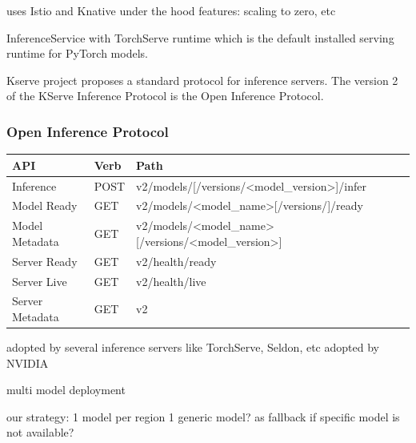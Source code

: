 uses Istio and Knative under the hood
features: scaling to zero, etc


InferenceService with TorchServe runtime which is the default installed serving runtime for PyTorch models.

Kserve project proposes a standard protocol for inference servers.
The version 2 of the KServe Inference Protocol is the Open Inference Protocol.

\subsubsection{Open Inference Protocol}

\begin{table}[h!]
\centering
\begin{tabular}{|l|l|l|}
\hline
\textbf{API}    & \textbf{Verb} & \textbf{Path}                                                                                         \\ \hline
Inference       & POST          & v2/models/{[}/versions/\textless{}model\_version\textgreater{}{]}/infer                               \\ \hline
Model Ready     & GET           & v2/models/\textless{}model\_name\textgreater{}{[}/versions/{]}/ready                                  \\ \hline
Model Metadata  & GET           & v2/models/\textless{}model\_name\textgreater{}{[}/versions/\textless{}model\_version\textgreater{}{]} \\ \hline
Server Ready    & GET           & v2/health/ready                                                                                       \\ \hline
Server Live     & GET           & v2/health/live                                                                                        \\ \hline
Server Metadata & GET           & v2                                                                                                    \\ \hline
\end{tabular}
\end{table}




adopted by several inference servers like TorchServe, Seldon, etc
adopted by NVIDIA



multi model deployment



our strategy:
1 model per region
1 generic model? as fallback if specific model is not available?




